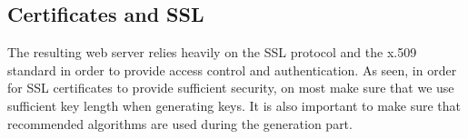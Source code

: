 \subsection {Certificates and SSL}

The resulting web server relies heavily on the SSL protocol and the x.509 standard in order to provide access control and authentication. As seen, in order for SSL certificates to provide sufficient security, on most make sure that we use sufficient key length when generating keys. It is also important to make sure that recommended algorithms are used during the generation part. 




